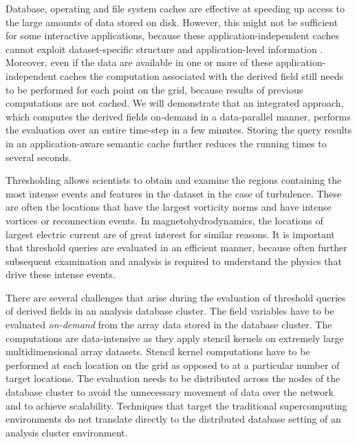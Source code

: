 \documentclass{sig-alternate}
\begin{document}

Database, operating and file system caches are effective at speeding up access to the large amounts of data stored on disk. However, this might not be
sufficient for some interactive applications, because these application-independent caches cannot exploit dataset-specific structure and application-level
information \cite{Lopez}. Moreover, even if the data are available in one or more of these application-independent caches the computation associated 
with the derived field still needs to be performed for each point on the grid, because results of previous computations are not cached. 
We will demonstrate that an integrated approach, which computes the derived fields on-demand in a data-parallel manner, performs the evaluation over 
an entire time-step in a few minutes. Storing the query results in an application-aware semantic cache further reduces the running times to several 
seconds.

Thresholding allows scientists to obtain and examine the regions containing the most intense events and features in the dataset in the case of turbulence. 
These are often the locations that have the largest vorticity norms and have intense vortices or reconnection events. 
In magnetohydrodynamics, the locations of largest electric current are of great interest for similar reasons.
It is important that threshold queries are evaluated in an efficient manner, because often further subsequent examination
and analysis is required to understand the physics that drive these intense events. 

There are several challenges that arise during the evaluation of threshold queries of derived fields in an analysis database cluster. The field variables have to be
evaluated \emph{on-demand} from the array data stored in the database cluster. The computations are data-intensive as they apply stencil kernels on extremely
large multidimensional array datasets. Stencil kernel computations have to be performed at each location on the grid as opposed to at a particular number 
of target locations. 
The evaluation needs to be distributed across the nodes of the database cluster to avoid the unnecessary movement of data over 
the network and to achieve scalability.
Techniques that target the traditional supercomputing environments do not translate directly to the 
distributed database setting of an analysis cluster environment. 
\end{document}
